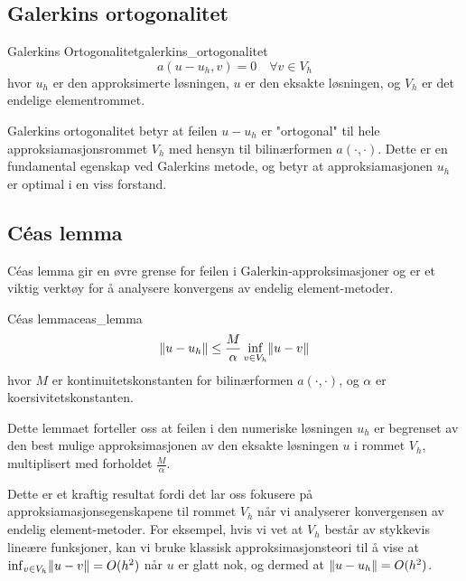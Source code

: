 \subsection*{Galerkins ortogonalitet}

\begin{definition}{Galerkins Ortogonalitet}{galerkins_ortogonalitet}
	\[
		a(u - u_h, v) = 0 \quad \forall v \in V_h
	\]
	hvor $u_h$ er den approksimerte løsningen, $u$ er den eksakte løsningen, og $V_h$ er det endelige elementrommet.
\end{definition}

Galerkins ortogonalitet betyr at feilen $u - u_h$ er "ortogonal" til hele approksiamasjonsrommet $V_h$ med hensyn til bilinærformen $a(\cdot,\cdot)$. Dette er en fundamental egenskap ved Galerkins metode, og betyr at approksiamasjonen $u_h$ er optimal i en viss forstand.

\subsection{Céas lemma}
Céas lemma gir en øvre grense for feilen i Galerkin-approksimasjoner og er et viktig verktøy for å analysere konvergens av endelig element-metoder.

\begin{lemma}{Céas lemma}{ceas_lemma}
	\[
		\norm*{u - u_h} \leq \frac{M}{\alpha} \inf_{v \in V_h} \norm*{u - v}
	\]
	hvor $M$ er kontinuitetskonstanten for bilinærformen $a(\cdot, \cdot)$, og $\alpha$ er koersivitetskonstanten.
\end{lemma}

Dette lemmaet forteller oss at feilen i den numeriske løsningen $u_h$ er begrenset av den best mulige approksimasjonen av den eksakte løsningen $u$ i rommet $V_h$, multiplisert med forholdet $\frac{M}{\alpha}$.

Dette er et kraftig resultat fordi det lar oss fokusere på approksiamasjonsegenskapene til rommet $V_h$ når vi analyserer konvergensen av endelig element-metoder. For eksempel, hvis vi vet at $V_h$ består av stykkevis lineære funksjoner, kan vi bruke klassisk approksimasjonsteori til å vise at $\inf_{v \in V_h} \norm*{u - v} = O(h^2)$ når $u$ er glatt nok, og dermed at $\norm*{u - u_h} = O(h^2)$.
